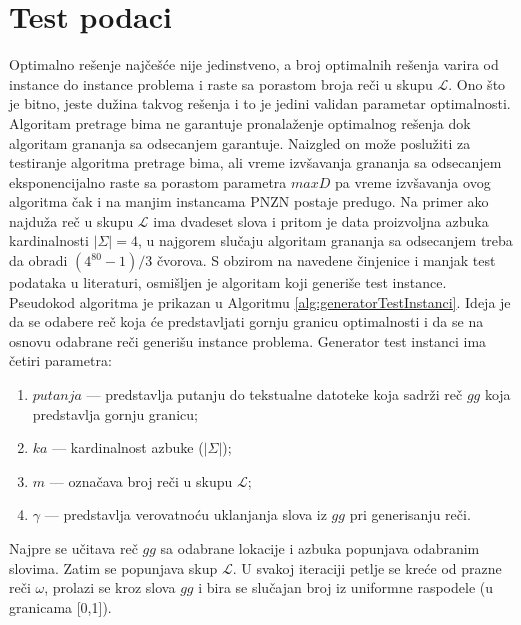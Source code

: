 \documentclass[12pt,oneside]{memoir}
\begin{document}
\section{Test podaci}
\label{sec:testPodaci}
Optimalno rešenje najčešće nije jedinstveno,
a broj optimalnih rešenja varira od instance do instance problema i raste sa porastom
broja reči u skupu $\mathcal{L}$. Ono što je bitno, jeste dužina takvog rešenja i to je
jedini validan parametar optimalnosti. Algoritam pretrage bima ne garantuje pronalaženje
optimalnog rešenja dok algoritam grananja sa odsecanjem garantuje. Naizgled on može poslužiti
za testiranje algoritma pretrage bima, ali
vreme izvšavanja grananja sa odsecanjem eksponencijalno raste sa porastom parametra $maxD$
pa vreme izvšavanja ovog algoritma čak i na manjim instancama PNZN postaje predugo.
Na primer ako najduža reč u skupu $\mathcal{L}$ ima dvadeset slova i pritom je
data proizvoljna azbuka kardinalnosti $|\Sigma|=4$, u najgorem slučaju
algoritam grananja sa odsecanjem treba da obradi $(4^{80}-1)/3$ čvorova.
S obzirom na navedene činjenice i manjak test podataka u literaturi, osmišljen je
algoritam koji generiše test instance. Pseudokod algoritma je prikazan u
Algoritmu \ref{alg:generatorTestInstanci}. Ideja je da se odabere reč koja će 
predstavljati gornju granicu optimalnosti i da se na osnovu odabrane reči
generišu instance problema.
Generator test instanci ima četiri parametra:
\begin{enumerate}
  \item $putanja$ — predstavlja putanju do
  tekstualne datoteke koja sadrži reč $gg$ koja predstavlja gornju granicu;
  \item $ka$ — kardinalnost azbuke ($|\Sigma|$);
  \item $m$ — označava broj reči u skupu $\mathcal{L}$;
  \item $\gamma$ — predstavlja verovatnoću uklanjanja slova iz $gg$ pri generisanju
  reči.
\end{enumerate}
Najpre se učitava reč $gg$ sa odabrane lokacije i azbuka popunjava
odabranim slovima. Zatim se popunjava skup $\mathcal{L}$.
U svakoj iteraciji petlje se kreće od prazne reči $\omega$, prolazi se
kroz slova $gg$ i bira se slučajan broj iz uniformne raspodele (u granicama [0,1]).
\end{document}
